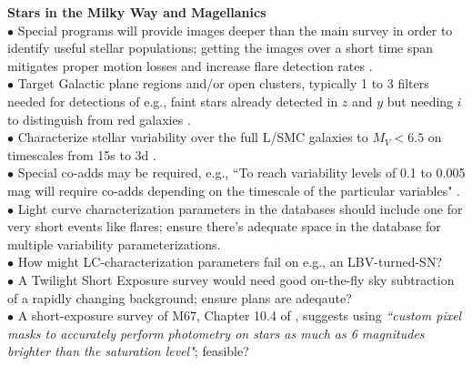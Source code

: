 \documentclass[DM,lsstdraft,toc]{lsstdoc}
\begin{document}
\noindent \textbf{Stars in the Milky Way and Magellanics} \\
$\bullet$ Special programs will provide images deeper than the main survey in order to identify useful stellar populations; getting the images over a short time span mitigates proper motion losses and increase flare detection rates \citep{DhitalWP}. \\
$\bullet$ Target Galactic plane regions and/or open clusters, typically 1 to 3 filters needed for detections of e.g., faint stars already detected in $z$ and $y$ but needing $i$ to distinguish from red galaxies \cite{DhitalWP}. \\
$\bullet$ Characterize stellar variability over the full L/SMC galaxies to $M_V<6.5$ on timescales from 15s to 3d \cite{SzkodyWP}. \\
$\bullet$ Special co-adds may be required, e.g., ``To reach variability levels of 0.1 to 0.005 mag will require co-adds depending on the timescale of the particular variables" \citep{SzkodyWP}. \\
$\bullet$ Light curve characterization parameters in the databases should include one for very short events like flares; ensure there's adequate space in the database for multiple variability parameterizations. \\
$\bullet$ How might LC-characterization parameters fail on e.g., an LBV-turned-SN? \\
$\bullet$ A Twilight Short Exposure survey would need good on-the-fly sky subtraction of a rapidly changing background; ensure plans are adeqaute? \\
$\bullet$ A short-exposure survey of M67, Chapter 10.4 of \cite{OSWP}, suggests using {\it ``custom pixel masks to accurately perform photometry on stars as much as 6 magnitudes brighter than the saturation level"}; feasible? \\
\end{document}
